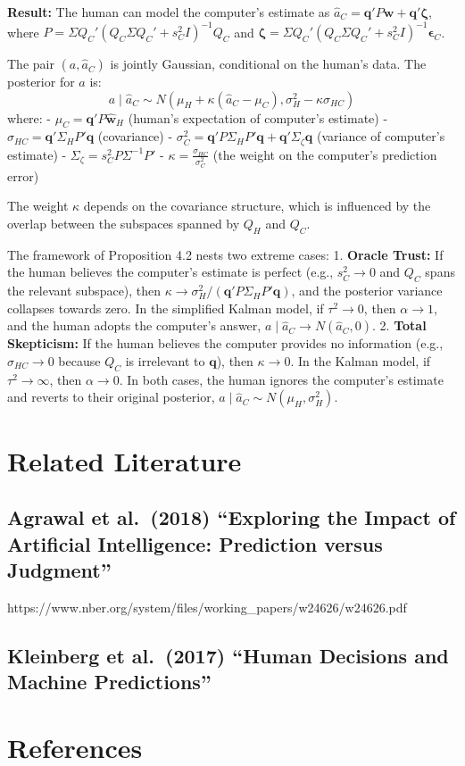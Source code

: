\documentclass[
  11pt,
  letterpaper,
  DIV=11,
  numbers=noendperiod,
  oneside]{scrartcl}
\providecommand{\tightlist}{%
  \setlength{\itemsep}{0pt}\setlength{\parskip}{0pt}}\usepackage{longtable,booktabs,array}
\newcommand{\bm}[1]{\boldsymbol{#1}}
\begin{document}
\textbf{Result:} The human can model the computer's estimate as
\(\hat{a}_C = \bm{q}'P\bm{w} + \bm{q}'\bm{\zeta}\), where
\(P = \Sigma Q_C'(Q_C\Sigma Q_C' + s_C^2I)^{-1}Q_C\) and
\(\bm{\zeta} = \Sigma Q_C'(Q_C\Sigma Q_C' + s_C^2I)^{-1}\bm{\epsilon}_C\).

The pair \((a, \hat{a}_C)\) is jointly Gaussian, conditional on the
human's data. The posterior for \(a\) is:
\[ a \mid \hat{a}_C \sim N\left( \mu_H + \kappa(\hat{a}_C - \mu_C), \sigma_H^2 - \kappa\sigma_{HC} \right) \]
where: - \(\mu_C = \bm{q}'P\hat{\bm{w}}_H\) (human's expectation of
computer's estimate) - \(\sigma_{HC} = \bm{q}'\Sigma_H P' \bm{q}\)
(covariance) -
\(\sigma_C^2 = \bm{q}'P\Sigma_H P' \bm{q} + \bm{q}'\Sigma_\zeta \bm{q}\)
(variance of computer's estimate) -
\(\Sigma_\zeta = s_C^2 P \Sigma^{-1} P'\) -
\(\kappa = \frac{\sigma_{HC}}{\sigma_C^2}\) (the weight on the
computer's prediction error)

The weight \(\kappa\) depends on the covariance structure, which is
influenced by the overlap between the subspaces spanned by \(Q_H\) and
\(Q_C\).

\begin{description}
\tightlist
\item[Proposition 4.3 (Limiting cases).]
The framework of Proposition 4.2 nests two extreme cases: 1.
\textbf{Oracle Trust:} If the human believes the computer's estimate is
perfect (e.g., \(s_C^2 \to 0\) and \(Q_C\) spans the relevant subspace),
then \(\kappa \to \sigma_H^2 / (\bm{q}'P\Sigma_H P'\bm{q})\), and the
posterior variance collapses towards zero. In the simplified Kalman
model, if \(\tau^2 \to 0\), then \(\alpha \to 1\), and the human adopts
the computer's answer, \(a \mid \hat{a}_C \to N(\hat{a}_C, 0)\). 2.
\textbf{Total Skepticism:} If the human believes the computer provides
no information (e.g., \(\sigma_{HC} \to 0\) because \(Q_C\) is
irrelevant to \(\bm{q}\)), then \(\kappa \to 0\). In the Kalman model,
if \(\tau^2 \to \infty\), then \(\alpha \to 0\). In both cases, the
human ignores the computer's estimate and reverts to their original
posterior, \(a \mid \hat{a}_C \sim N(\mu_H, \sigma_H^2)\).
\end{description}

\section{Related Literature}\label{related-literature}

\subsection{Agrawal et al.~(2018) ``Exploring the Impact of Artificial
Intelligence: Prediction versus
Judgment''}\label{agrawal-et-al.-2018-exploring-the-impact-of-artificial-intelligence-prediction-versus-judgment}

https://www.nber.org/system/files/working\_papers/w24626/w24626.pdf

\subsection{Kleinberg et al.~(2017) ``Human Decisions and Machine
Predictions''}\label{kleinberg-et-al.-2017-human-decisions-and-machine-predictions}

\section{References}\label{references}
\end{document}
